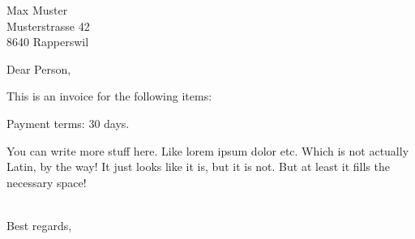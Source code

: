 \documentclass[SN,11pt,enlargefirstpage=true,sps]{scrlttr2}
\begin{document}
\begin{letter}{Max Muster\\Musterstrasse 42\\8640 Rapperswil}

  \opening{Dear Person,}

  This is an invoice for the following items:

  \begin{invoice}{0.0}%
  \end{invoice}

  Payment terms: 30 days.

	You can write more stuff here. Like lorem ipsum dolor etc. Which is not
	actually Latin, by the way! It just looks like it is, but it is not. But at
	least it fills the necessary space!

  \closing{\\Best regards,}

\end{letter}
\end{document}

